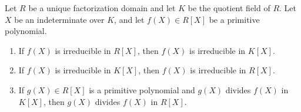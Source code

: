 Let $R$ be a unique factorization domain and let $K$ be the quotient field of $R$. Let $X$ be an indeterminate over $K$, and let $f(X) \in R[X]$ be a primitive polynomial.

\begin{enumerate}
\item[(1)] If $f(X)$ is irreducible in $R[X]$, then $f(X)$ is irreducible in $K[X]$.
\item[(2)] If $f(X)$ is irreducible in $K[X]$, then $f(X)$ is irreducible in $R[X]$.
\item[(3)] If $g(X) \in R[X]$ is a primitive polynomial and $g(X)$ divides $f(X)$ in $K[X]$, then $g(X)$ divides $f(X)$ in $R[X]$.
\end{enumerate}
